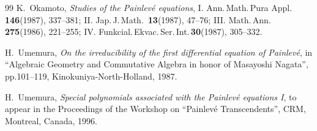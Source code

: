 \begin{thebibliography}{99}
 K.~Okamoto, {\em Studies of the Painlev\'e equations}, I.
Ann.\,Math.\,Pura Appl.\,{\bf 146}(1987), 337--381; 
II. Jap.\,J.\,Math.\, {\bf 13}(1987), 47--76;
III. Math.\,Ann.\, {\bf 275}(1986), 221--255; 
IV. Funkcial.\,Ekvac.\,Ser.\,Int.\,{\bf 30}(1987), 305--332.




 H.~Umemura, 
{\em On the irreducibility of the first differential equation of Painlev\'e},
in ``Algebraic Geometry and Commutative Algebra in honor of Masayoshi Nagata'',
pp.101--119, Kinokuniya-North-Holland, 1987. 

 H.~Umemura, 
{\em Special polynomials associated with the Painlev\'e equations I},
to appear in the Proceedings of the Workshop on ``Painlev\'e Transcendents'', 
CRM, Montreal, Canada, 1996. 

\end{thebibliography}




